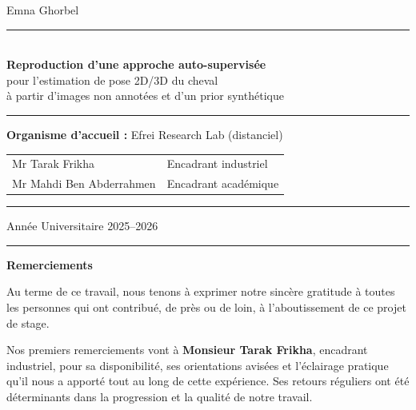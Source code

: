 \documentclass[12pt,a4paper]{article}
\begin{document}
\begin{titlepage}
{    Emna Ghorbel\\[5pt]
    
  }

  \vspace{1.5cm}

  \noindent\rule{\linewidth}{1pt}\\[0.3cm]
  {\Large\textbf{Reproduction d'une approche auto-supervis\'{e}e}}\\[0.15cm]
  {\large pour l'estimation de pose 2D/3D du cheval}\\
  {\normalsize \`{a} partir d'images non annot\'{e}es et d'un prior synth\'{e}tique}\\[0.3cm]
  \noindent\rule{\linewidth}{1pt}

  \vspace{0.5cm}
  {\normalsize \textbf{Organisme d'accueil :} Efrei Research Lab (distanciel)}

  \vspace{0.5cm}

  \centering
  \begin{tabular}{p{10cm} p{3cm}}
    Mr Tarak Frikha & Encadrant industriel \\[2pt]
    Mr Mahdi Ben Abderrahmen & Encadrant acad\'{e}mique \\[2pt]
  \end{tabular}

  \vfill

  \noindent\rule{3cm}{0.5pt}\quad Année Universitaire 2025--2026 \quad\rule{3cm}{0.5pt}

\end{titlepage}

\newpage
\thispagestyle{empty}
\vspace*{2cm}
{\centering\Large\bfseries Remerciements\par}
\vspace{1cm}

Au terme de ce travail, nous tenons \`{a} exprimer notre sinc\`{e}re gratitude \`{a} toutes les personnes qui ont contribu\'{e}, de pr\`{e}s ou de loin, \`{a} l'aboutissement de ce projet de stage.

Nos premiers remerciements vont \`{a} \textbf{Monsieur Tarak Frikha}, encadrant industriel, pour sa disponibilit\'{e}, ses orientations avis\'{e}es et l'\'{e}clairage pratique qu'il nous a apport\'{e} tout au long de cette exp\'{e}rience. Ses retours r\'{e}guliers ont \'{e}t\'{e} d\'{e}terminants dans la progression et la qualit\'{e} de notre travail.
\end{document}

